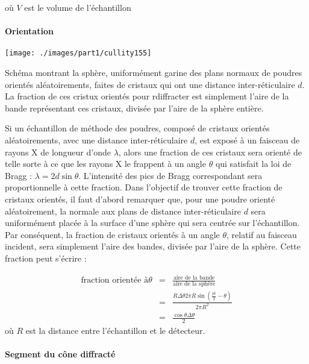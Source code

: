 où $V$ est le volume de l'échantillon

\paragraph{Orientation}

\begin{marginfigure}
    \texttt{[image: ./images/part1/cullity155]}
    \caption{Schéma montrant la sphère, uniformément garine des plans normaux de poudres orientés aléatoirements, faites de cristaux qui ont une distance inter-réticulaire $d$. La fraction de ces cristux orientés pour rdiffracter est simplement l'aire de la bande représentant ces cristaux, divisée par l'aire de la sphère entière.}
    \label{fig:}
\end{marginfigure}

Si un échantillon de méthode des poudres, composé de cristaux orientés aléatoirements, avec une distance inter-réticulaire $d$, est exposé à un faisceau de rayons X de longueur d'onde $\lambda$, alors une fraction de ces cristaux sera orienté de telle sorte à ce que les rayons X le frappent à un angle $\theta$ qui satisfait la loi de Bragg : $\lambda = 2d \sin \theta$. L'intensité des pics de Bragg correspondant sera proportionnelle à cette fraction. Dans l'objectif de trouver cette fraction de cristaux orientés, il faut d'abord remarquer que, pour une poudre orienté aléatoirement, la normale aux plans de distance inter-réticulaire $d$ sera uniformément placée à la surface d'une sphère qui sera centrée sur l'échantillon. Par conséquent, la fraction de cristaux orientés à un angle $\theta$, relatif au faisceau incident, sera simplement l'aire des bandes, divisée par l'aire de la sphère. Cette fraction peut s'écrire :

\begin{eqnarray}
    \text{fraction orientée à} \theta & = & \frac{\text{aire de la bande}}{\text{aire de la sphère}} \\
    & = & \frac{R\Delta \theta 2 \pi R \sin \left(\frac{pi}{2} - \theta \right)}{2\pi R^2}\\
    & = & \frac{\cos\theta \Delta \theta}{2}
    \label{eq:orientation}
\end{eqnarray}
où $R$ est la distance entre l'échantillon et le détecteur.

\paragraph{Segment du cône diffracté}

